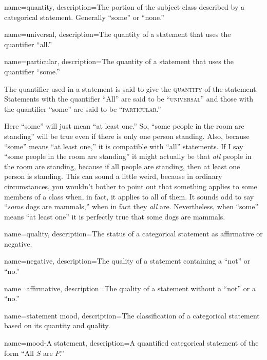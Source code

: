 {
name=quantity,
description={The portion of the subject class described by a categorical statement. Generally ``some'' or ``none.''}
}

{
name=universal,
description={The quantity of a statement that uses the quantifier ``all.''}
}

{
name=particular,
description={The quantity of a statement that uses the quantifier ``some.''}
}

The quantifier used in a statement is said to give the \textsc{\gls{quantity}} \label{def:Quantity} of the statement. Statements with the quantifier ``All'' are said to be ``\textsc{\gls{universal}}'' and those with the quantifier ``some'' are said to be ``\textsc{\gls{particular}}.''

Here ``some'' will just mean ``at least one.'' So, ``some people in the room are standing'' will be true even if there is only one person standing. Also, because ``some'' means ``at least one,'' it is compatible with ``all'' statements. If I say ``some people in the room are standing'' it might actually be that \textit{all} people in the room are standing, because if all people are standing, then at least one person is standing. This can sound a little weird, because in ordinary circumstances, you wouldn't bother to point out that something applies to some members of a class when, in fact, it applies to all of them. It sounds odd to say ``\textit{some} dogs are mammals,'' when in fact they \textit{all} are. Nevertheless, when ``some'' means ``at least one'' it is perfectly true that some dogs are mammals. 


{
name=quality,
description={The status of a categorical statement as affirmative or negative.}
}

{
name=negative,
description={The quality of a statement containing a ``not'' or ``no.''}
}

{
name=affirmative,
description={The quality of a statement without a ``not'' or a ``no.''}
}



{
name=statement mood,
description={The classification of a categorical statement based on its quantity and quality.}
}

{
name=mood-A statement,
description={A quantified categorical statement of the form ``All $S$ are $P$.''}
}

